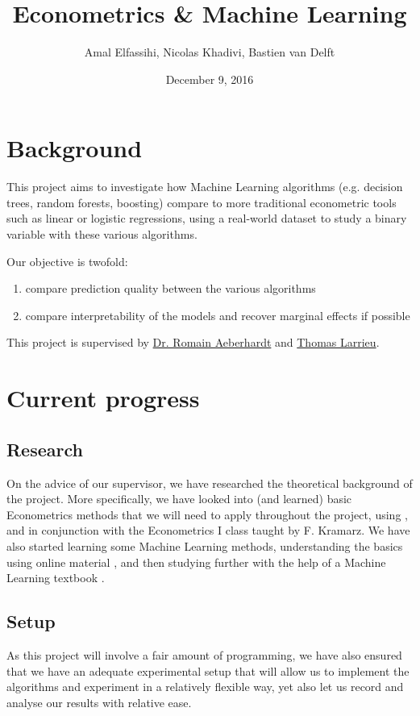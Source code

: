 \documentclass[a4paper]{article}
\begin{document}
\title{Econometrics \& Machine Learning}
\author{Amal Elfassihi, Nicolas Khadivi, Bastien van Delft}
\date{December 9, 2016}
\maketitle

\section{Background}
This project aims to investigate how Machine Learning algorithms (e.g. decision trees, random
forests, boosting) compare to more traditional econometric tools such as linear or logistic
regressions, using a real-world dataset \cite{enquete} to study a binary variable with these
various algorithms.

Our objective is twofold:
\begin{enumerate}[nosep]
    \item compare prediction quality between the various algorithms
    \item compare interpretability of the models and recover marginal effects if possible
\end{enumerate}

This project is supervised by \href{http://www.crest.fr/pagesperso.php?user=3045}{Dr. Romain
Aeberhardt} and \href{http://thomas-larrieu.strikingly.com/}{Thomas Larrieu}.

\section{Current progress} \subsection{Research} On the advice of our supervisor, we have researched
the theoretical background of the project. More specifically, we have looked into (and learned)
basic Econometrics methods that we will need to apply throughout the project, using
\cite{wooldridge}, and in conjunction with the Econometrics I class taught by F. Kramarz. We have
also started learning some Machine Learning methods, understanding the basics using online material
\cite{vidhya}, and then studying further with the help of a Machine Learning textbook \cite{introR}.

\subsection{Setup} As this project will involve a fair amount of programming, we have also ensured
that we have an adequate experimental setup that will allow us to implement the algorithms and
experiment in a relatively flexible way, yet also let us record and analyse our results with
relative ease.
\end{document}

